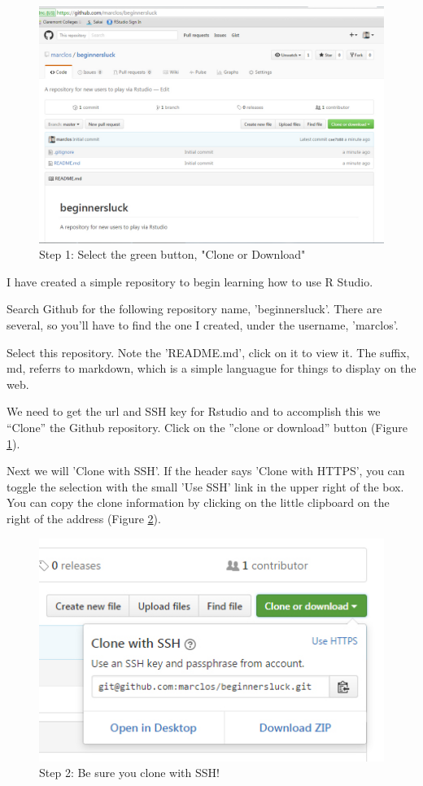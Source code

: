 \documentclass[12pt]{../SOP3_beta}
\begin{document}
\begin{figure}[H]
\includegraphics{graphics/CloningGithub.jpg}
\caption{Step 1: Select the green button, "Clone or Download"}
\label{fig:step1}
\end{figure}

\NP I have created a simple repository to begin learning how to use R Studio.

\NP Search Github for the following repository name, 'beginnersluck'. There are several, so you'll have to find the one I created, under the username, 'marclos'. 

\NP Select this repository. Note the 'README.md', click on it to view it. The suffix, md, referrs to markdown, which is a simple languague for things to display on the web.

\NP We need to get the url and SSH key for Rstudio and to accomplish this we ``Clone'' the Github repository. Click on the ''clone or download'' button (Figure \ref{fig:step1}).


\NP Next we will 'Clone with SSH'. If the header says 'Clone with HTTPS', you can toggle the selection with the small 'Use SSH' link in the upper right of the box. You can copy the clone information by clicking on the little clipboard on the right of the address (Figure \ref{fig:step2}).

\begin{figure}[H]
\includegraphics{graphics/CloningGithub2.jpg}
\caption{Step 2: Be sure you clone with SSH!}
\label{fig:step2}
\end{figure}
\end{document}
